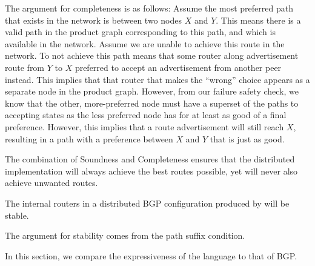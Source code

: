 The argument for completeness is as follows: Assume the most preferred path that exists in the network is between two nodes $X$ and $Y$.  This means there is a valid path in the product graph corresponding to this path, and which is available in the network. 
Assume we are unable to achieve this route in the network. To not achieve this path means that some router along advertisement route from $Y$ to $X$ preferred to accept an advertisement from another peer instead. This implies that that router that makes the ``wrong'' choice appears as a separate node in the product graph. However, from our failure safety check, we know that the other, more-preferred node must have a superset of the paths to accepting states as the less preferred node has for at least as good of a final preference. However, this implies that a route advertisement will still reach $X$, resulting in a path with a preference between $X$ and $Y$ that is just as good.

The combination of Soundness and Completeness ensures that the distributed implementation will always achieve the best routes possible, yet will never also achieve unwanted routes. 

\begin{defn}
The internal routers in a distributed BGP configuration produced by \sysname will be stable. 
\end{defn}

The argument for stability comes from the path suffix condition.



In this section, we compare the expressiveness of the \sysname language to that of BGP.


